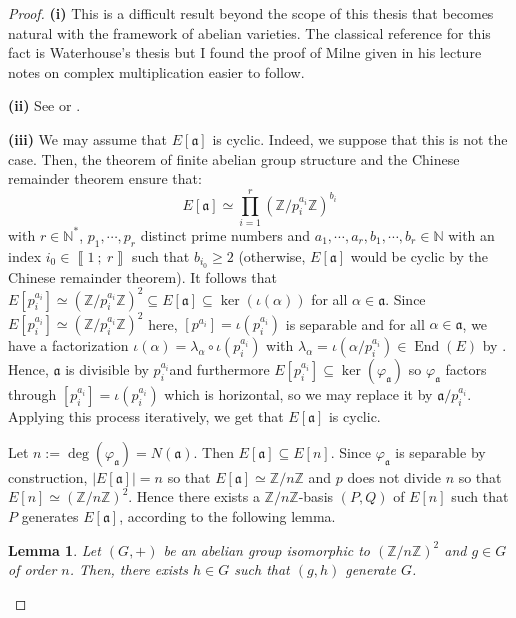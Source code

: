 \documentclass[a4paper,10pt]{report}
\theoremstyle{definition}
\theoremstyle{plain}
\newtheorem{lemma}[definition]{Lemma}
\theoremstyle{definition}
\newcommand{\N}{\mathbb{N}}
\newcommand{\Z}{\mathbb{Z}}
\renewcommand{\i}[2]{\left\llbracket #1~;~#2\right\rrbracket}
\renewcommand{\(}{\left(}
\renewcommand{\)}{\right)}
\newcommand{\mf}[1]{\mathfrak{#1}}
\DeclareMathOperator{\End}{End}
\begin{document}
\begin{proof}
\textbf{(i)} This is a difficult result beyond the scope of this thesis that becomes natural with the framework of abelian varieties. The classical reference for this fact is Waterhouse's thesis \cite[proposition 3.12]{Waterhouse1969} but I found the proof of Milne given in his lecture notes on complex multiplication \cite[proposition 7.28]{Milne_CM} easier to follow.

\textbf{(ii)} See \cite[theorem 3.15]{Waterhouse1969} or \cite[proposition 7.29]{Milne_CM}.

\textbf{(iii)} We may assume that $E[\mf{a}]$ is cyclic. Indeed, we suppose that this is not the case. Then, the theorem of finite abelian group structure and the Chinese remainder theorem ensure that:
\[E[\mf{a}]\simeq\prod_{i=1}^r (\Z/p_i^{a_i}\Z)^{b_i}\]
with $r\in\N^*$, $p_1, \cdots, p_r$ distinct prime numbers and $a_1, \cdots, a_r, b_1, \cdots, b_r\in\N$ with an index $i_0\in\i{1}{r}$ such that $b_{i_0}\geq 2$ (otherwise, $E[\mf{a}]$ would be cyclic by the Chinese remainder theorem). It follows that $E[p_i^{a_i}]\simeq(\Z/p_i^{a_i}\Z)^2\subseteq E[\mf{a}]\subseteq\ker(\iota(\alpha))$ for all $\alpha\in\mf{a}$. Since $E[p_i^{a_i}]\simeq(\Z/p_i^{a_i}\Z)^2$ here, $[p^{a_i}]=\iota(p_i^{a_i})$ is separable and for all $\alpha\in\mf{a}$, we have a factorization $\iota(\alpha)=\lambda_\alpha\circ \iota(p_i^{a_i})$ with $\lambda_\alpha=\iota(\alpha/p_i^{a_i})\in\End(E)$ by \cite[corollary III.4.11]{Silverman1}. Hence, $\mf{a}$ is divisible by $p_i^{a_i}$and furthermore $E[p_i^{a_i}]\subseteq \ker(\varphi_{\mf{a}})$ so $\varphi_{\mf{a}}$ factors through $[p_i^{a_i}]=\iota(p_i^{a_i})$ which is horizontal, so we may replace it by $\mf{a}/p_i^{a_i}$. Applying this process iteratively, we get that $E[\mf{a}]$ is cyclic. 

Let $n:=\deg(\varphi_{\mf{a}})=N(\mf{a})$. Then $E[\mf{a}]\subseteq E[n]$. Since $\varphi_{\mf{a}}$ is separable by construction, $|E[\mf{a}]|=n$ so that $E[\mf{a}]\simeq\Z/n\Z$ and $p$ does not divide $n$ so that $E[n]\simeq (\Z/n\Z)^2$.  Hence there exists a $\Z/n\Z$-basis $(P,Q)$ of $E[n]$ such that $P$ generates $E[\mf{a}]$, according to the following lemma.

\begin{lemma}
Let $(G,+)$ be an abelian group isomorphic to $(\Z/n\Z)^2$ and $g\in G$ of order $n$. Then, there exists $h\in G$ such that $(g,h)$ generate $G$.
\end{lemma}


\end{proof}
\end{document}
